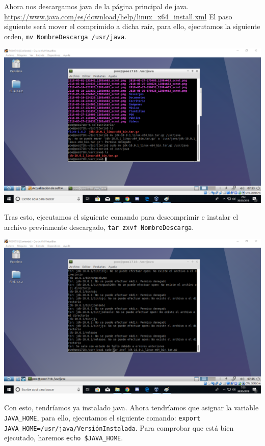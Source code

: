 \documentclass[12pt,letterpaper]{article}
\begin{document}
Ahora nos descargamos java de la página principal de java. \url{https://www.java.com/es/download/help/linux_x64_install.xml} 
El paso siguiente será mover el comprimido a dicha raíz, para ello, ejecutamos la siguiente orden, \texttt{mv NombreDescarga /usr/java}.
\begin{center}
	\includegraphics[scale=0.5]{3.png}
\end{center}
Tras esto, ejecutamos el siguiente comando para descomprimir e instalar el archivo previamente descargado, \texttt{tar zxvf NombreDescarga}.
\begin{center}
	\includegraphics[scale=0.5]{4.png}
\end{center}
Con esto, tendríamos ya instalado java. Ahora tendríamos que asignar la variable \texttt{JAVA\_HOME}, para ello, ejecutamos el siguiente comando: \texttt{export JAVA\_HOME=/usr/java/VersiónInstalada}. Para comprobar que está bien ejecutado, haremos \texttt{echo \$JAVA\_HOME}.
\end{document}
